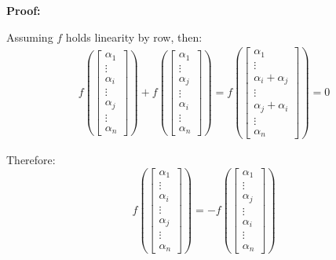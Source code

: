 \documentclass{article}
\begin{document}
\vspace{2mm}
\textbf{Proof:}

Assuming \(f\) holds linearity by row, then:
\begin{equation}
\begin{split}
f(
\begin{bmatrix}
    \alpha_1 \\
    \vdots \\
    \alpha_i \\
    \vdots \\
    \alpha_j \\
    \vdots \\
    \alpha_n
\end{bmatrix}) + 
f(\begin{bmatrix}
    \alpha_1 \\
    \vdots \\
    \alpha_j \\
    \vdots \\
    \alpha_i \\
    \vdots \\
    \alpha_n
\end{bmatrix})
=
f(\begin{bmatrix}
    \alpha_1 \\
    \vdots \\
    \alpha_i + \alpha_j \\
    \vdots \\
    \alpha_j + \alpha_i \\
    \vdots \\
    \alpha_n
\end{bmatrix})=0
\end{split}
\end{equation}

Therefore:
\begin{equation}
f(
\begin{bmatrix}
    \alpha_1 \\
    \vdots \\
    \alpha_i \\
    \vdots \\
    \alpha_j \\
    \vdots \\
    \alpha_n
\end{bmatrix}) = 
-f(\begin{bmatrix}
    \alpha_1 \\
    \vdots \\
    \alpha_j \\
    \vdots \\
    \alpha_i \\
    \vdots \\
    \alpha_n
\end{bmatrix})
\end{equation}
\end{document}
